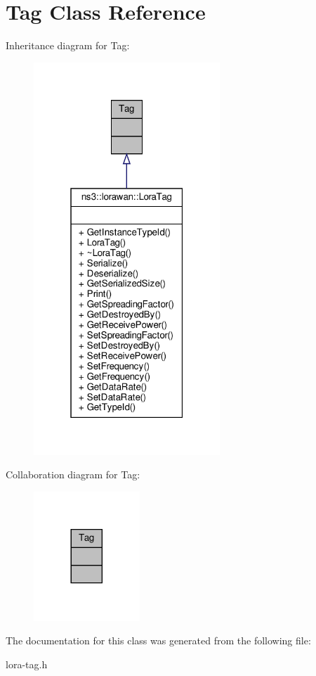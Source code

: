\hypertarget{classTag}{}\section{Tag Class Reference}
\label{classTag}


Inheritance diagram for Tag\+:
\nopagebreak
\begin{figure}[H]
\begin{center}
\leavevmode
\includegraphics[width=199pt]{classTag__inherit__graph}
\end{center}
\end{figure}


Collaboration diagram for Tag\+:
\nopagebreak
\begin{figure}[H]
\begin{center}
\leavevmode
\includegraphics[width=113pt]{classTag__coll__graph}
\end{center}
\end{figure}


The documentation for this class was generated from the following file\+:\begin{DoxyCompactItemize}
\item 
lora-\/tag.\+h\end{DoxyCompactItemize}
